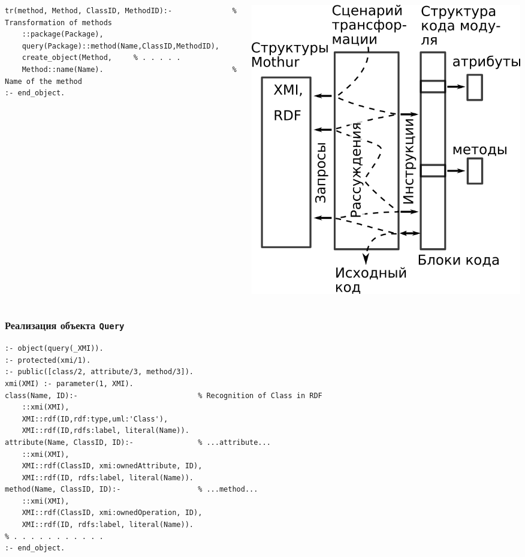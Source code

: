 \documentclass[10pt]{beamer}
\begin{document}
\begin{frame}[fragile]
\begin{columns}
\begin{column}{0.6\textwidth}
\begin{verbatim}
tr(method, Method, ClassID, MethodID):-              % Transformation of methods
    ::package(Package),
    query(Package)::method(Name,ClassID,MethodID),
    create_object(Method,     % . . . . .
    Method::name(Name).                              % Name of the method
:- end_object.
\end{verbatim}
    \end{column}
    \begin{column}{0.4\linewidth}
      \includegraphics[width=1\linewidth]{scenario-ru.png}
    \end{column}
  \end{columns}
\end{frame}

\begin{frame}[fragile]
  \frametitle{Реализация объекта \texttt{Query}} \begin{verbatim}
:- object(query(_XMI)).
:- protected(xmi/1).
:- public([class/2, attribute/3, method/3]).
xmi(XMI) :- parameter(1, XMI).
class(Name, ID):-                            % Recognition of Class in RDF
    ::xmi(XMI),
    XMI::rdf(ID,rdf:type,uml:'Class'),
    XMI::rdf(ID,rdfs:label, literal(Name)).
attribute(Name, ClassID, ID):-               % ...attribute...
    ::xmi(XMI),
    XMI::rdf(ClassID, xmi:ownedAttribute, ID),
    XMI::rdf(ID, rdfs:label, literal(Name)).
method(Name, ClassID, ID):-                  % ...method...
    ::xmi(XMI),
    XMI::rdf(ClassID, xmi:ownedOperation, ID),
    XMI::rdf(ID, rdfs:label, literal(Name)).
% . . . . . . . . . . .
:- end_object.
\end{verbatim}
\end{frame}
\end{document}
